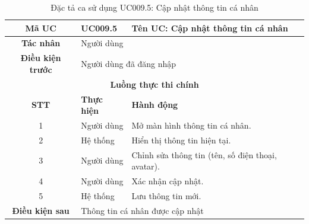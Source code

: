 \begin{table}[H]
    \centering
    \label{tab:uc009-5}
    \begin{tabularx}{\textwidth}{|c|p{3.5cm}|X|}
        \hline
        \rowcolor{headergreen} 
        \textbf{Mã UC} & \textbf{UC009.5} & \textbf{Tên UC: Cập nhật thông tin cá nhân} \\ \hline
        \textbf{Tác nhân} & \multicolumn{2}{l|}{Người dùng} \\ \hline
        \textbf{Điều kiện trước} & \multicolumn{2}{X|}{Người dùng đã đăng nhập} \\ \hline
        
        \multicolumn{3}{|c|}{\cellcolor{headerorange}\textbf{Luồng thực thi chính}} \\ \hline
        \rowcolor{graybg} \textbf{STT} & \textbf{Thực hiện} & \textbf{Hành động} \\ \hline
        1 & Người dùng & Mở màn hình thông tin cá nhân. \\ \hline
        2 & Hệ thống & Hiển thị thông tin hiện tại. \\ \hline
        3 & Người dùng & Chỉnh sửa thông tin (tên, số điện thoại, avatar). \\ \hline
        4 & Người dùng & Xác nhận cập nhật. \\ \hline
        5 & Hệ thống & Lưu thông tin mới. \\ \hline
        
        \textbf{Điều kiện sau} & \multicolumn{2}{X|}{Thông tin cá nhân được cập nhật} \\ \hline
    \end{tabularx}
    \caption{Đặc tả ca sử dụng UC009.5: Cập nhật thông tin cá nhân}
\end{table}

